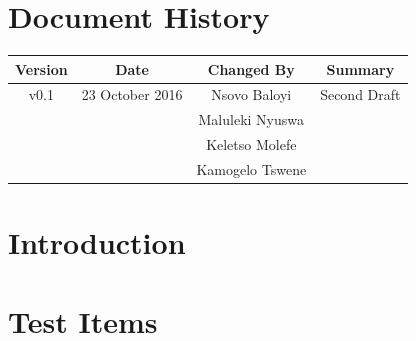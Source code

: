 \documentclass[a4paper,12pt]{article}
\begin{document}
	\newpage
	
	\tableofcontents
	\newpage
	
	
	\section*{Document History}
	
	\begin{table}[h!]
		
		\centering %
		\begin{tabular}{c c c c} %
			\hline\hline %
			Version & Date & Changed By & Summary \\ [0.5ex] %
			\hline %
			v0.1 & 23 October 2016 & Nsovo Baloyi & Second Draft 
			\\ & & Maluleki Nyuswa &  
			\\ & & Keletso Molefe &
			\\ & & Kamogelo Tswene & \\ [1ex] 
			\hline
		\end{tabular}
		\label{table:nonlin} %
	\end{table}

	\newpage
	
	\section{Introduction}	
	
	
	
	
	\section{Test Items}	
		
	
	
	
\end{document}
